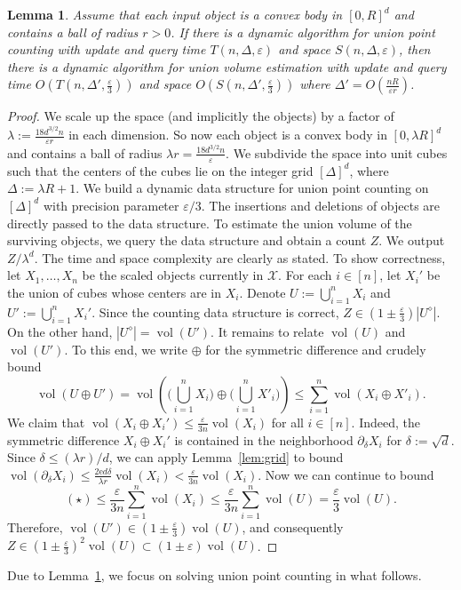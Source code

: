 \documentclass[11pt]{article}
\def\vol{\operatorname{vol}}		%
\newtheorem{lemma}[theorem]{Lemma}
\newcommand{\eps}{\varepsilon}
\newcommand{\class}[1]{\mathcal{#1}}
\newcommand{\discrete}[1]{#1^\diamond}
\begin{document}
%
\begin{lemma}
    \label{lem:discretization}
    Assume that each input object is a convex body in $[0,R]^d$ and contains a ball of radius $r>0$. If there is a dynamic algorithm for union point counting with update and query time $T(n,\Delta,\eps)$ and space $S(n,\Delta,\eps)$, then there is a dynamic algorithm for union volume estimation with update and query time $O(T(n, \Delta', \frac{\eps}{3}))$ and space $O(S(n, \Delta', \frac{\eps}{3}))$ where $\Delta' = O(\frac{n R}{\eps r})$.
\end{lemma}
%
\begin{proof}
    We scale up the space (and implicitly the objects) by a factor of $\lambda := \frac{18 d^{3/2} n}{\eps r}$ in each dimension. So now each object is a convex body in $[0, \lambda R]^d$ and contains a ball of radius $\lambda r = \frac{18 d^{3/2} n}{\eps}$. We subdivide the space into unit cubes such that the centers of the cubes lie on the integer grid $[\Delta]^d$, where $\Delta := \lambda R + 1$. We build a dynamic data structure for union point counting on $[\Delta]^d$ with precision parameter $\eps/3$. The insertions and deletions of objects are directly passed to the data structure. To estimate the union volume of the surviving objects, we query the data structure and obtain a count $Z$. We output $Z/\lambda^d$.
%
    The time and space complexity are clearly as stated. To show correctness, let $X_1, \dots, X_n$ be the scaled objects currently in $\class{X}$. For each $i \in [n]$, let $X_i'$ be the union of cubes whose centers are in $X_i$. Denote $U := \bigcup_{i=1}^n X_i$ and $U' := \bigcup_{i=1}^n X_i'$. Since the counting data structure is correct, $Z \in (1\pm\frac{\eps}{3}) |\discrete{U}|$. On the other hand, $|\discrete{U}| = \vol(U')$. It remains to relate $\vol(U)$ and $\vol(U')$. To this end, we write $\oplus$ for the symmetric difference and crudely bound
    \[
        \vol(U \oplus U')
        = \vol \left( \bigg( \bigcup_{i=1}^n X_i \bigg) \oplus \bigg( \bigcup_{i=1}^n X'_i \bigg) \right)
        \leq \sum_{i=1}^n \vol(X_i \oplus X'_i). \tag{$\star$}
    \]
%
    We claim that $\vol(X_i \oplus X_i') \leq \frac{\eps}{3n} \vol(X_i)$ for all $i \in [n]$. Indeed, the symmetric difference $X_i \oplus X_i'$ is contained in the neighborhood $\partial_\delta X_i$ for $\delta := \sqrt{d}$. Since $\delta \leq (\lambda r)/d$, we can apply Lemma~\ref{lem:grid} to bound $\vol(\partial_\delta X_i) \leq \frac{2 \mathrm{e} d \delta}{\lambda r} \vol(X_i) < \frac{\eps}{3n} \vol(X_i)$. Now we can continue to bound
    \[
        (\star)
        \leq \frac{\eps}{3n} \sum_{i=1}^n \vol(X_i)
        \leq \frac{\eps}{3n} \sum_{i=1}^n \vol(U)
        = \frac{\eps}{3} \vol(U).
    \]
    Therefore, $\vol(U') \in (1 \pm \frac{\eps}{3}) \vol(U)$, and consequently $Z \in (1\pm \frac{\eps}{3})^2 \vol(U) \subset (1\pm\eps) \vol(U)$.
\end{proof}
%
Due to Lemma~\ref{lem:discretization}, we focus on solving union point counting in what follows.
%
\end{document}
